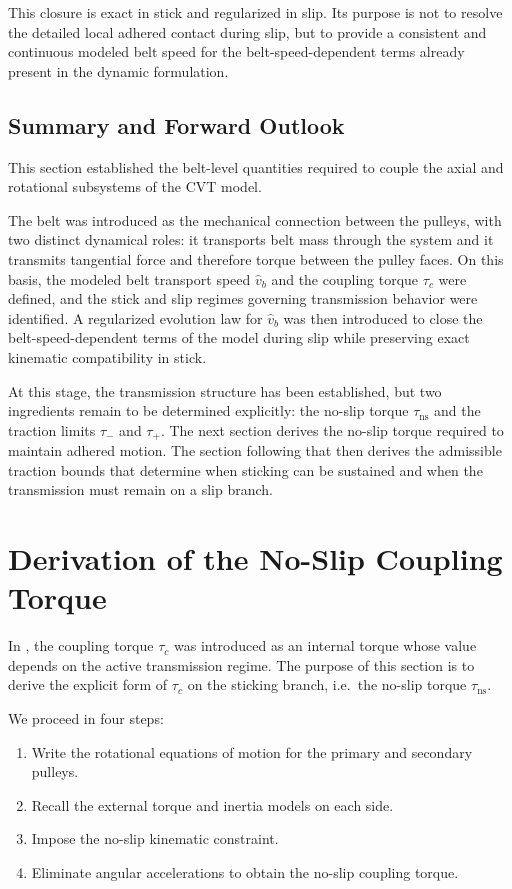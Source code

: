 \documentclass[11pt]{article}
\numberwithin{equation}{section}
\begin{document}
This closure is exact in stick and regularized in slip.
Its purpose is not to resolve the detailed local adhered contact during slip,
but to provide a consistent and continuous modeled belt speed for the
belt-speed-dependent terms already present in the dynamic formulation.

\subsection{Summary and Forward Outlook}

This section established the belt-level quantities required to couple the
axial and rotational subsystems of the CVT model.

The belt was introduced as the mechanical connection between the pulleys,
with two distinct dynamical roles: it transports belt mass through the
system and it transmits tangential force and therefore torque between the
pulley faces. On this basis, the modeled belt transport speed $\hat{v}_b$
and the coupling torque $\tau_c$ were defined, and the stick and slip
regimes governing transmission behavior were identified. A regularized
evolution law for $\hat{v}_b$ was then introduced to close the
belt-speed-dependent terms of the model during slip while preserving exact
kinematic compatibility in stick.

At this stage, the transmission structure has been established, but two
ingredients remain to be determined explicitly: the no-slip torque
$\tau_{\mathrm{ns}}$ and the traction limits $\tau_-$ and $\tau_+$.
The next section derives the no-slip torque required to maintain adhered
motion. The section following that then derives the admissible traction
bounds that determine when sticking can be sustained and when the
transmission must remain on a slip branch.

\section{Derivation of the No-Slip Coupling Torque}
\label{sec:tau_ns}

In , the coupling torque $\tau_c$ was introduced
as an internal torque whose value depends on the active transmission regime.
The purpose of this section is to derive the explicit form of $\tau_c$ on the
sticking branch, i.e.\ the no-slip torque $\tau_{\mathrm{ns}}$.

We proceed in four steps:

\begin{enumerate}
    \item Write the rotational equations of motion for the primary and secondary pulleys.
    \item Recall the external torque and inertia models on each side.
    \item Impose the no-slip kinematic constraint.
    \item Eliminate angular accelerations to obtain the no-slip coupling torque.
\end{enumerate}
\end{document}
